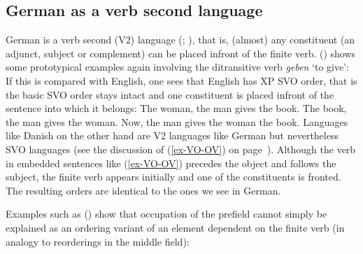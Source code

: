 \subsection{German as a verb second language}
\label{sec-v2-phen}

German is a verb second (V2) language (\citealp[Chapter~2.4]{Erdmann1886a};
\citealp[, ]{Paul1919a}), that is, (almost) any constituent (an adjunct, subject or
complement) can be placed infront of the finite verb. () shows some prototypical examples again involving the ditransitive verb
\emph{geben} `to give':
\eal
{}
\zl
If this is compared with English, one sees that English has XP SVO order, that is the basic SVO
order stays intact and one constituent is placed infront of the sentence into which it belongs:
\eal
\ex The woman, the man gives the book.
\ex The book, the man gives the woman.
\ex Now, the man gives the woman the book.
\zl
Languages like Danish on the other hand are V2 languages like German but nevertheless SVO languages
(see the discussion of (\ref{ex-VO-OV}) on page~\pageref{ex-VO-OV}). Although the verb in embedded
sentences like (\ref{ex-VO-OV}) precedes the object and follows the subject, the finite verb appears
initially and one of the constituents is fronted. The resulting orders are identical to the ones we
see in German. 



Examples such as () show that occupation of the prefield cannot simply be explained as an ordering variant of an element dependent on 
the finite verb (in analogy to reorderings in the middle field):

